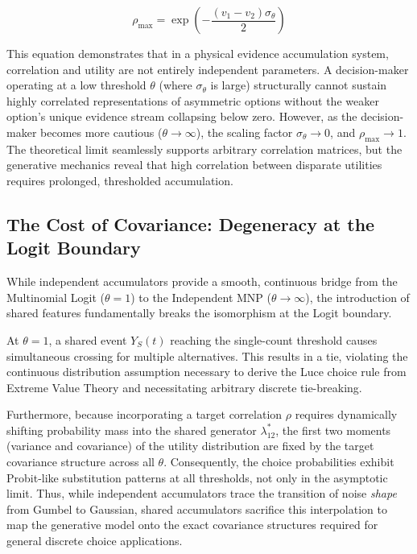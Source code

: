 \documentclass[
  man,
  floatsintext,
  longtable,
  a4paper,
  nolmodern,
  notxfonts,
  notimes,
  colorlinks=true,linkcolor=blue,citecolor=blue,urlcolor=blue]{apa7}
\begin{document}
\[\rho_{\max} = \exp\left(-\frac{(v_1 - v_2) \sigma_\theta}{2}\right)\]

This equation demonstrates that in a physical evidence accumulation
system, correlation and utility are not entirely independent parameters.
A decision-maker operating at a low threshold \(\theta\) (where
\(\sigma_\theta\) is large) structurally cannot sustain highly
correlated representations of asymmetric options without the weaker
option's unique evidence stream collapsing below zero. However, as the
decision-maker becomes more cautious (\(\theta \to \infty\)), the
scaling factor \(\sigma_\theta \to 0\), and \(\rho_{\max} \to 1\). The
theoretical limit seamlessly supports arbitrary correlation matrices,
but the generative mechanics reveal that high correlation between
disparate utilities requires prolonged, thresholded accumulation.

\subsection{The Cost of Covariance: Degeneracy at the Logit
Boundary}\label{the-cost-of-covariance-degeneracy-at-the-logit-boundary}

While independent accumulators provide a smooth, continuous bridge from
the Multinomial Logit (\(\theta=1\)) to the Independent MNP
(\(\theta \to \infty\)), the introduction of shared features
fundamentally breaks the isomorphism at the Logit boundary.

At \(\theta=1\), a shared event \(Y_S(t)\) reaching the single-count
threshold causes simultaneous crossing for multiple alternatives. This
results in a tie, violating the continuous distribution assumption
necessary to derive the Luce choice rule from Extreme Value Theory and
necessitating arbitrary discrete tie-breaking.

Furthermore, because incorporating a target correlation \(\rho\)
requires dynamically shifting probability mass into the shared generator
\(\lambda_{12}^*\), the first two moments (variance and covariance) of
the utility distribution are fixed by the target covariance structure
across all \(\theta\). Consequently, the choice probabilities exhibit
Probit-like substitution patterns at all thresholds, not only in the
asymptotic limit. Thus, while independent accumulators trace the
transition of noise \emph{shape} from Gumbel to Gaussian, shared
accumulators sacrifice this interpolation to map the generative model
onto the exact covariance structures required for general discrete
choice applications.
\end{document}

